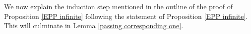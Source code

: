 \documentclass{amsart}
\newtheorem{lemma}[theorem]{Lemma}
\theoremstyle{definition}
\newcommand\HHH{{\mathbb H}}
\newcommand\Z{{\mathbb Z}}
\begin{document}
\begin{comment}
content...

We now verify the components of  $\tilde{\mathbf E}^\mathrm{ext}$ satisfy three conditions of relative hyperbolicity by Farb and Bowditch:
one is the quasi-convexity as we have just proved, the second is uniform separability which trivially holds, and the third is the following uniform boundedness.


\begin{lemma}
\label{uniformly bounded}
There is a constant $D$ depending only on $\Gamma$ such that for any two distinct components $\Pi_1, \Pi_2$ of  $\tilde{\mathbf E}^\mathrm{ext}$, the diameter of the nearest projection of $\Pi_1$ to $\Pi_2$ in $\tilde{\mathbf M}_\Gamma$ has diameter bounded by $D$.
\end{lemma}
\begin{proof}
Since $\Gamma$ acts on the set of components of $\widetilde{\mathbf E}^\mathrm{ext}$ transitively, and the action of $\Gamma$ on $\widetilde{\mathbf M}_\Gamma$ is properly discontinuous, we have only to show that there are no two components $\Pi_1, \Pi_2$ such that the nearest projection of $\Pi_2$ to $\Pi_1$ has infinite diameter.
Let $H_1$ and $H_2$ subgroups of $\Gamma$ which are stabilisers of $\Pi_1$ and $\Pi_2$ respectively.
These are both conjugate to $\pi_1(\Sigma)$ regarded as a subgroup of $\Gamma$ naturally as above.
Since $\widetilde{\mathbf M}_\Gamma$ is quasi-isometric to $\HHH^3$ equivariantly with respect to the actions of $\Gamma$, if the diameter of the nearest projection of $\Pi_2$ to $\Pi_1$ is infinite, there is an intersection between the limit sets of $H_1$ and $H_2$.
Since $H_1 \cap H_2 = \{1\}$, by the work of Anderson etc, %

{\bf Comment: What if $\partial \Sigma$ has 2 curves that get identified to a non-separating boundary curve on $S$?
	Then $H_1 \cap H_2 = \Z$

In fact if there are 2 degenerate ends sharing a common parabolic, then also this will not be possible.

However, this is not necessary for the electrocution argument to go through.}

this is impossible.
\end{proof}
\end{comment}

 We now explain the induction step mentioned in the outline of the proof of Proposition \ref{EPP infinite} following the statement of Proposition \ref{EPP infinite}.
This will culminate in Lemma \ref{passing corresponding one}.
\end{document}
